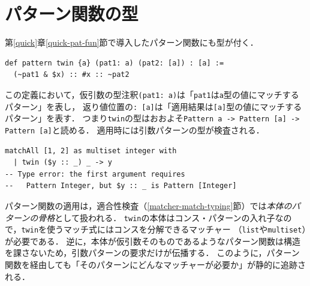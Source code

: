 \section{パターン関数の型}\label{matcher-patfun-types}

第\ref{quick}章\ref{quick-pat-fun}節で導入したパターン関数にも型が付く．
\begin{lstlisting}[language=egison,numbers=none]
def pattern twin {a} (pat1: a) (pat2: [a]) : [a] :=
  (~pat1 & $x) :: #x :: ~pat2
\end{lstlisting}
この定義において，仮引数の型注釈\lstinline{(pat1: a)}は「\lstinline{pat1}は\lstinline{a}型の値にマッチするパターン」を表し，
返り値位置の\lstinline{: [a]}は「適用結果は\lstinline{[a]}型の値にマッチするパターン」を表す．
つまり\lstinline{twin}の型はおおよそ\lstinline{Pattern a -> Pattern [a] -> Pattern [a]}と読める．
適用時には引数パターンの型が検査される．
\begin{lstlisting}[language=egison,numbers=none]
matchAll [1, 2] as multiset integer with
  | twin ($y :: _) _ -> y
-- Type error: the first argument requires
--   Pattern Integer, but $y :: _ is Pattern [Integer]
\end{lstlisting}

パターン関数の適用は，適合性検査（\ref{matcher-match-typing}節）では\emph{本体のパターンの骨格}として扱われる．
\lstinline{twin}の本体はコンス・パターンの入れ子なので，\lstinline{twin}を使うマッチ式にはコンスを分解できるマッチャー
（\lstinline{list}や\lstinline{multiset}）が必要である．
逆に，本体が仮引数そのものであるようなパターン関数は構造を課さないため，引数パターンの要求だけが伝播する．
このように，パターン関数を経由しても「そのパターンにどんなマッチャーが必要か」が静的に追跡される．

